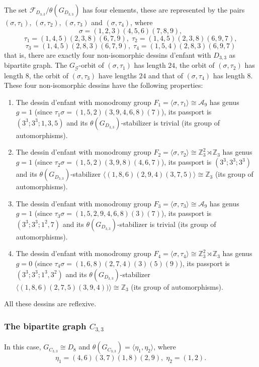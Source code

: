 \documentclass[12pt]{amsart}
\theoremstyle{remark}
\begin{document}
The set ${\mathcal F}_{D_{3,3}}/\theta(G_{D_{3,3}})$ has four elements, these are represented by the pairs
$(\sigma,\tau_{1})$, $(\sigma,\tau_{2})$, $(\sigma,\tau_{3})$ and $(\sigma,\tau_{4})$, 
where
$$\sigma=(1,2,3)(4,5,6)(7,8,9),$$
$$\tau_{1}=(1,4,5)(2,3,8)(6,7,9), \; \tau_{2}=(1,4,5)(2,3,8)(6,9,7),$$
$$\tau_{3}=(1,4,5)(2,8,3)(6,7,9), \; \tau_{4}=(1,5,4)(2,8,3)(6,9,7)$$
that is, there are exactly four non-isomorphic dessins d'enfant with $D_{3,3}$ as bipartite graph. The $G_{\mathcal G}$-orbit of $(\sigma,\tau_{1})$ has length $24$, the orbit of $(\sigma,\tau_{2})$ has length $8$, the orbit of $(\sigma,\tau_{3})$ have lengths $24$ and that of $(\sigma,\tau_{4})$ has length $8$.
These four non-isomorphic dessins have the following properties:
\begin{enumerate} 
\item The dessin d'enfant with monodromy group $F_{1}=\langle \sigma,\tau_{1}\rangle \cong {\mathcal A}_{9}$ has genus $g=1$ (since $\tau_{1}\sigma=(1,5,2)(3,9,4,6,8)(7)$), its passport is $(3^3;3^3;1,3,5)$ and its 
$\theta(G_{D_{3,3}})$-stabilizer is trivial (its group of automorphisms).

\item The dessin d'enfant with monodromy group $F_{2}=\langle \sigma,\tau_{2}\rangle \cong {\mathbb Z}_{3}^{2} \rtimes {\mathbb Z}_{3}$ has genus  $g=1$ (since $\tau_{2}\sigma=(1,5,2)(3,9,8)(4,6,7)$), its passport is
$(3^3;3^3;3^3)$ and its 
$\theta(G_{D_{3,3}})$-stabilizer $\langle (1,8,6)(2,9,4)(3,7,5) \rangle \cong {\mathbb Z}_{3}$ (its group of automorphisms).

\item The dessin d'enfant with monodromy group $F_{3}=\langle \sigma,\tau_{3}\rangle \cong {\mathcal A}_{9}$ has genus $g=1$ (since $\tau_{3}\sigma=(1,5,2,9,4,6,8)(3)(7)$), its passport is $(3^3;3^3;1^2,7)$ and its 
$\theta(G_{D_{3,3}})$-stabilizer is trivial (its group of automorphisms).

\item The dessin d'enfant with monodromy group $F_{4}=\langle \sigma,\tau_{4}\rangle \cong {\mathbb Z}_{3}^{2} \rtimes {\mathbb Z}_{3}$ has genus $g=0$ (since $\tau_{4}\sigma=(1,6,8)(2,7,4)(3)(5)(9)$), its passport is $(3^3;3^3;1^3,3^2)$ and its
 $\theta(G_{D_{3,3}})$-stabilizer $\langle (1,8,6)(2,7,5)(3,9,4))\rangle \cong  {\mathbb Z}_{3}$ (its group of automorphisms). 
 \end{enumerate}

All these dessins are reflexive.

\subsubsection{The bipartite graph $C_{3,3}$}
In this case, $G_{C_{3,3}}\cong D_{8}$ and $\theta(G_{C_{3,3}})=\langle \eta_{1}, \eta_{2} \rangle$,
where $$\eta_{1}=(4,6)(3,7)(1,8)(2,9),\; \eta_{2}=(1,2).$$
\end{document}
